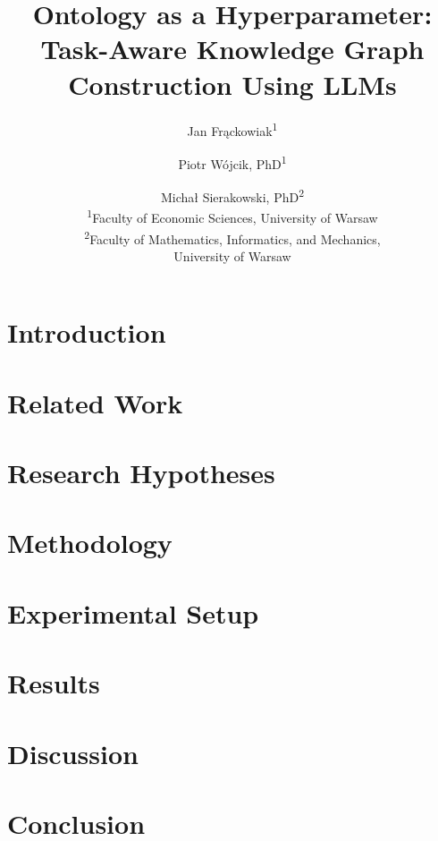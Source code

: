 \documentclass[12pt, a4paper]{article}
\title{Ontology as a Hyperparameter: Task-Aware Knowledge Graph Construction Using LLMs}
\author{
  Jan Fr\k{a}ckowiak\textsuperscript{1} \and
  Piotr W\'{o}jcik, PhD\textsuperscript{1} \and
  Micha\l{} Sierakowski, PhD\textsuperscript{2} \\[0.5em]
  \textsuperscript{1}Faculty of Economic Sciences, University of Warsaw \\[0.3em]
  \textsuperscript{2}Faculty of Mathematics, Informatics, and Mechanics,\\
  University of Warsaw
}
\date{}
\begin{document}
\maketitle

\begin{abstract}

\end{abstract}

\newpage
\tableofcontents
\newpage

\section{Introduction}


\section{Related Work}\label{sec:related}


\section{Research Hypotheses}\label{sec:hypotheses}


\section{Methodology}\label{sec:methodology}


\section{Experimental Setup}\label{sec:experiments}


\section{Results}\label{sec:results}


\section{Discussion}\label{sec:discussion}


\section{Conclusion}\label{sec:conclusion}




\end{document}
